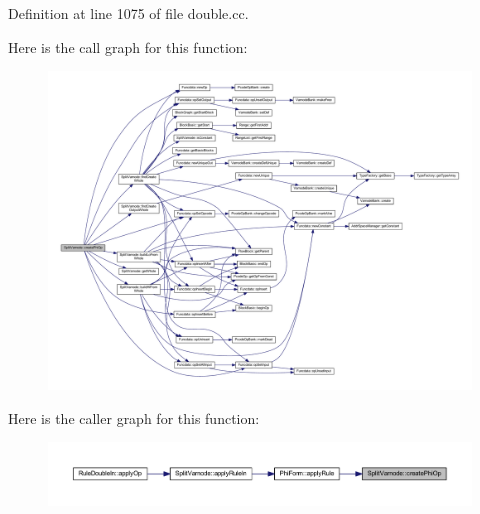 Definition at line 1075 of file double.\+cc.

Here is the call graph for this function\+:
\nopagebreak
\begin{figure}[H]
\begin{center}
\leavevmode
\includegraphics[width=350pt]{class_split_varnode_afb3f6dcf9f8412ffb6120f652991cce6_cgraph}
\end{center}
\end{figure}
Here is the caller graph for this function\+:
\nopagebreak
\begin{figure}[H]
\begin{center}
\leavevmode
\includegraphics[width=350pt]{class_split_varnode_afb3f6dcf9f8412ffb6120f652991cce6_icgraph}
\end{center}
\end{figure}
\mbox{\label{class_split_varnode_a106126352280623608ffbb571d25b387}} 

